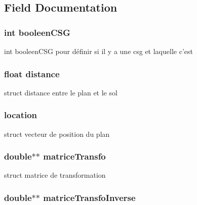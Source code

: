 \subsection{Field Documentation}
\hypertarget{structplane_a4428e32d4383f7dee25e5a4cb192da24}{
\subsubsection[{booleenCSG}]{\setlength{\rightskip}{0pt plus 5cm}int {\bf booleenCSG}}}
\label{structplane_a4428e32d4383f7dee25e5a4cb192da24}
int booleenCSG pour définir si il y a une csg et laquelle c'est \hypertarget{structplane_a06f14a9abd47b91465f895d5259cdc1b}{
\subsubsection[{distance}]{\setlength{\rightskip}{0pt plus 5cm}float {\bf distance}}}
\label{structplane_a06f14a9abd47b91465f895d5259cdc1b}
struct distance entre le plan et le sol \hypertarget{structplane_ae655d799d0a983ee8cf5fc840953c404}{
\subsubsection[{location}]{ {\bf location}}}
\label{structplane_ae655d799d0a983ee8cf5fc840953c404}
struct vecteur de position du plan \hypertarget{structplane_aa06ccc348007e3355beccf412f2f656c}{
\subsubsection[{matriceTransfo}]{\setlength{\rightskip}{0pt plus 5cm}double$\ast$$\ast$ {\bf matriceTransfo}}}
\label{structplane_aa06ccc348007e3355beccf412f2f656c}
struct matrice de transformation \hypertarget{structplane_acd7a3590501dcccfaefccbb658f83821}{
\subsubsection[{matriceTransfoInverse}]{\setlength{\rightskip}{0pt plus 5cm}double$\ast$$\ast$ {\bf matriceTransfoInverse}}}
